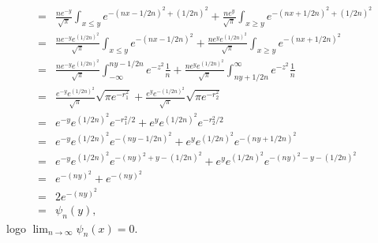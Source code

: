 \documentclass{article}
\begin{document}
\begin{enumerate}
\begin{enumerate}
$$\begin{aligned}
					\\
					= & \frac{ne^{-y}}{\sqrt{\pi}}\int_{x \leq y} e^{-(nx - 1/2n)^{2} + (1/2n)^{2}} + \frac{ne^{y}}{\sqrt{\pi}}\int_{x \geq y} e^{-(nx + 1/2n)^{2} + (1/2n)^{2}}
					\\
					= & \frac{ne^{-y}e^{ (1/2n)^{2}}}{\sqrt{\pi}}\int_{x \leq y} e^{-(nx - 1/2n)^{2}} + \frac{ne^{y}e^{ (1/2n)^{2}}}{\sqrt{\pi}}\int_{x \geq y} e^{-(nx + 1/2n)^{2}}
					\\
					= & \frac{ne^{-y}e^{(1/2n)^{2}}}{\sqrt{\pi}} \int_{-\infty}^{ny-1/2n} e^{-z^{2}}\frac{1}{n} + \frac{ne^{y}e^{ (1/2n)^{2}}}{\sqrt{\pi}}\int_{ny+1/2n}^{\infty} e^{-z^{2}}\frac{1}{n}
					\\
					= & \frac{e^{-y}e^{(1/2n)^{2}}}{\sqrt{\pi}} \sqrt{\pi e^{-r_{1}^{2}}} + \frac{e^{y}e^{ - (1/2n)^{2}}}{\sqrt{\pi}}\sqrt{\pi e^{-r_{2}^{2}}}
					\\
					= & e^{-y}e^{(1/2n)^{2}} e^{-r_{1}^{2}/2}+ e^{y}e^{(1/2n)^{2}} e^{-r_{2}^{2}/2}
					\\
					= & e^{-y}e^{(1/2n)^{2}} e^{-(ny-1/2n)^{2}}+ e^{y}e^{ (1/2n)^{2}} e^{-(ny+1/2n)^{2}}
					\\
					= & e^{-y}e^{(1/2n)^{2}} e^{-(ny)^{2}+y - (1/2n)^{2}}+ e^{y}e^{ (1/2n)^{2}}e^{-(ny)^{2}-y - (1/2n)^{2}}
					\\
					= &  e^{-(ny)^{2}}+ e^{-(ny)^{2}}
					\\
					= & 2e^{-(ny)^{2}}
					\\
					= & \psi_{n}(y),
					\end{aligned}
					$$
					logo $\lim_{n \to \infty} \psi_{n}(x) = 0$.
					

\end{enumerate}
\end{enumerate}
\end{document}
